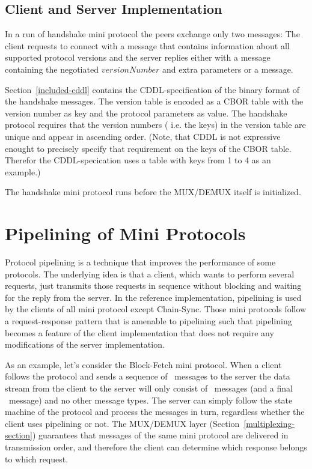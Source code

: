 \documentclass{report}
\newcommand{\wip}[1]{\color{magenta}{#1}\color{black}}
\theoremstyle{definition}{
  \newtheorem{lemma}{Lemma}[section] %
  \newtheorem{definition}[lemma]{Definition}
}
\theoremstyle{theorem}{
  \newtheorem{invariant}[lemma]{Invariant}
  \newtheorem{proofobligation}[lemma]{Proof Obligation}
}
\numberwithin{equation}{lemma}
\begin{document}
\subsection{Client and Server Implementation}
In a run of handshake mini protocol the peers exchange only two messages:
The client requests to connect with a \ProposeVersions{} message that contains information about
all supported protocol versions
and the server replies either with a \AcceptVersion{} message containing the negotiated
$versionNumber$ and extra parameters or a \Refuse{} message.

Section~\ref{included-cddl} contains the CDDL-specification of the binary format of the handshake messages.
The version table is encoded as a CBOR table with the version number as key
and the protocol parameters as value.
The handshake protocol requires that the version numbers ( i.e. the keys) in the version table are unique
and appear in ascending order.
(Note, that CDDL is not expressive enought to precisely specify that requirement on the keys of the CBOR
table. Therefor the CDDL-specication uses a table with keys from 1 to 4 as an example.)

The handshake mini protocol runs before the MUX/DEMUX itself is initialized.
\wip{
see in the code if this is still true:
Each message is transmitted within a single MUX segment, i.e. with a proper segment header,
but, as the MUX/DEMUX is not yet running the messages must not be split into multiple segments.
}

\section{Pipelining of Mini Protocols}
\label{pipelining}
Protocol pipelining is a technique that improves the performance of some protocols.
The underlying idea is that a client, which wants to perform several requests,
just transmits those requests in sequence without blocking and waiting for the reply from the server.
In the reference implementation, pipelining is used by the clients of all mini protocol except Chain-Sync.
Those mini protocols follow a request-response pattern that is amenable to pipelining such
that pipelining becomes a feature of the client implementation that does not require any
modifications of the server implementation.

As an example, let's consider the Block-Fetch mini protocol.
When a client follows the protocol and sends a sequence of \RequestRange~messages to the server
the data stream from the client to the server will only consist of \RequestRange~messages
(and a final \ClientDone~message) and no other message types.
The server can simply follow the state machine of the protocol and process the messages in turn,
regardless whether the client uses pipelining or not.
The MUX/DEMUX layer (Section~\ref{multiplexing-section}) guarantees
that messages of the same mini protocol are delivered in transmission order,
and therefore the client can determine which response belongs to which request.
\end{document}
